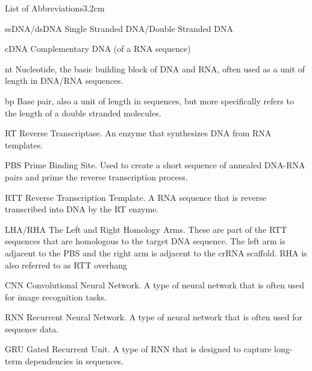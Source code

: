 \begin{mclistof}{List of Abbreviations}{3.2cm}

    \item[ssDNA/dsDNA] Single Stranded DNA/Double Stranded DNA
    
    \item[cDNA] Complementary DNA (of a RNA sequence)
    
    \item[nt] Nucleotide, the basic building block of DNA and RNA, often used as a unit of length in DNA/RNA sequences.
    
    \item[bp] Base pair, also a unit of length in sequences, but more specifically refers to the length of a double stranded molecules.   

    \item[RT] Reverse Transcriptase. An enzyme that synthesizes DNA from RNA templates.

    \item[PBS] Prime Binding Site. Used to create a short sequence of annealed DNA-RNA pairs and prime the reverse transcription process. 

    \item[RTT] Reverse Transcription Template. A RNA sequence that is reverse transcribed into DNA by the RT enzyme.

    \item[LHA/RHA] The Left and Right Homology Arms. These are part of the RTT sequences that are homologous to the target DNA sequence. The left arm is adjacent to the PBS and the right arm is adjacent to the crRNA scaffold. RHA is also referred to as RTT overhang
    
    \item[CNN] Convolutional Neural Network. A type of neural network that is often used for image recognition tasks.
    
    \item[RNN] Recurrent Neural Network. A type of neural network that is often used for sequence data.
    
    \item[GRU] Gated Recurrent Unit. A type of RNN that is designed to capture long-term dependencies in sequences.

\end{mclistof} 